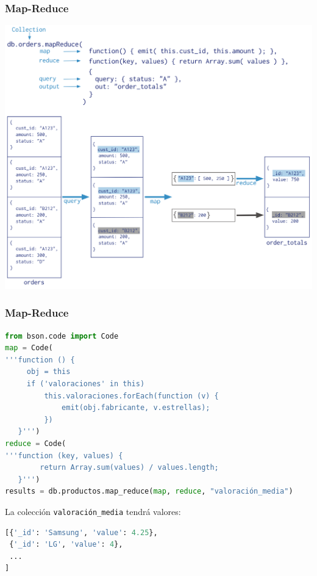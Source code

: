 \documentclass[14pt]{beamer}
\begin{document}
\begin{frame}
  \frametitle{Map-Reduce}
  \centering\includegraphics[height=.85\textheight]{img/mongo-map-reduce}
\end{frame}

\begin{frame}
  \frametitle{Map-Reduce}


\begin{lstlisting}[language=Python]
from bson.code import Code
map = Code(
'''function () {
     obj = this
     if ('valoraciones' in this)
         this.valoraciones.forEach(function (v) {
             emit(obj.fabricante, v.estrellas);
         })
   }''')
reduce = Code(
'''function (key, values) {
        return Array.sum(values) / values.length;
   }''')
results = db.productos.map_reduce(map, reduce, "valoración_media")
\end{lstlisting}

\framebreak

La colección {\tt valoración\_media} tendrá valores:

\begin{lstlisting}[language=Python]
[{'_id': 'Samsung', 'value': 4.25},
 {'_id': 'LG', 'value': 4},
 ...
]
\end{lstlisting}

\end{frame}
\end{document}
